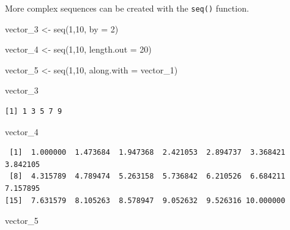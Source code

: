 \documentclass[
  letterpaper,
  DIV=11,
  numbers=noendperiod]{scrartcl}
\newenvironment{Shaded}{\begin{snugshade}}{\end{snugshade}}
\newcommand{\AttributeTok}[1]{\textcolor[rgb]{0.40,0.45,0.13}{#1}}
\newcommand{\DecValTok}[1]{\textcolor[rgb]{0.68,0.00,0.00}{#1}}
\newcommand{\FunctionTok}[1]{\textcolor[rgb]{0.28,0.35,0.67}{#1}}
\newcommand{\NormalTok}[1]{\textcolor[rgb]{0.00,0.23,0.31}{#1}}
\newcommand{\OtherTok}[1]{\textcolor[rgb]{0.00,0.23,0.31}{#1}}
\begin{document}
\begin{tcolorbox}[enhanced jigsaw, bottomtitle=1mm, colframe=quarto-callout-note-color-frame, opacitybacktitle=0.6, rightrule=.15mm, colbacktitle=quarto-callout-note-color!10!white, coltitle=black, toprule=.15mm, toptitle=1mm, arc=.35mm, left=2mm, titlerule=0mm, opacityback=0, colback=white, bottomrule=.15mm, breakable, title=\textcolor{quarto-callout-note-color}{\faInfo}\hspace{0.5em}{Note}, leftrule=.75mm]

More complex sequences can be created with the \texttt{seq()} function.

\begin{Shaded}
\begin{Highlighting}[]
\NormalTok{vector\_3 }\OtherTok{\textless{}{-}} \FunctionTok{seq}\NormalTok{(}\DecValTok{1}\NormalTok{,}\DecValTok{10}\NormalTok{, }\AttributeTok{by =} \DecValTok{2}\NormalTok{)}

\NormalTok{vector\_4 }\OtherTok{\textless{}{-}} \FunctionTok{seq}\NormalTok{(}\DecValTok{1}\NormalTok{,}\DecValTok{10}\NormalTok{, }\AttributeTok{length.out =} \DecValTok{20}\NormalTok{)}

\NormalTok{vector\_5 }\OtherTok{\textless{}{-}} \FunctionTok{seq}\NormalTok{(}\DecValTok{1}\NormalTok{,}\DecValTok{10}\NormalTok{, }\AttributeTok{along.with =}\NormalTok{ vector\_1)}

\NormalTok{vector\_3}
\end{Highlighting}
\end{Shaded}

\begin{verbatim}
[1] 1 3 5 7 9
\end{verbatim}

\begin{Shaded}
\begin{Highlighting}[]
\NormalTok{vector\_4}
\end{Highlighting}
\end{Shaded}

\begin{verbatim}
 [1]  1.000000  1.473684  1.947368  2.421053  2.894737  3.368421  3.842105
 [8]  4.315789  4.789474  5.263158  5.736842  6.210526  6.684211  7.157895
[15]  7.631579  8.105263  8.578947  9.052632  9.526316 10.000000
\end{verbatim}

\begin{Shaded}
\begin{Highlighting}[]
\NormalTok{vector\_5}
\end{Highlighting}
\end{Shaded}


\end{tcolorbox}
\end{document}
